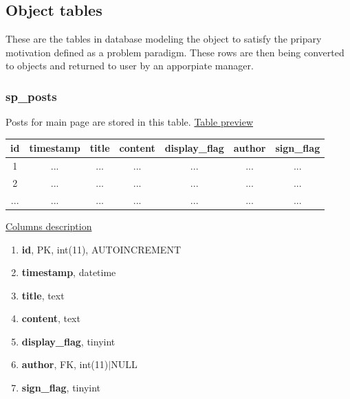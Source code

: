 \subsection{Object tables}
These are the tables in database modeling the object to satisfy the pripary motivation defined as a problem paradigm. These rows are then being converted to objects and returned to user by an apporpiate manager.
\subsubsection*{sp\_posts}
Posts for main page are stored in this table.
\newline
\underline{Table preview}
\begin{center}
  \begin{tabular}{||c c c c c c c||} 
  \hline
  id & timestamp & title & content & display\_flag & author & sign\_flag  \\ [0.5ex] 
  \hline\hline
  1 & ... & ... & ... & ... & ... & ... \\ 
  \hline
  2 & ... & ... & ... & ... & ... & ... \\ 
 \hline
  ... & ... & ... & ... & ... & ...  & ... \\ [1ex] 
  \hline
  \end{tabular}
\end{center}
\underline{Columns description}
\begin{enumerate}
  \setlength\itemsep{0em}
  \item \textbf{id}, PK, int(11), AUTOINCREMENT
  \item \textbf{timestamp}, datetime
  \item \textbf{title}, text
  \item \textbf{content}, text
  \item \textbf{display\_flag}, tinyint
  \item \textbf{author}, FK, int(11)$|$NULL
  \item \textbf{sign\_flag}, tinyint
\end{enumerate}

